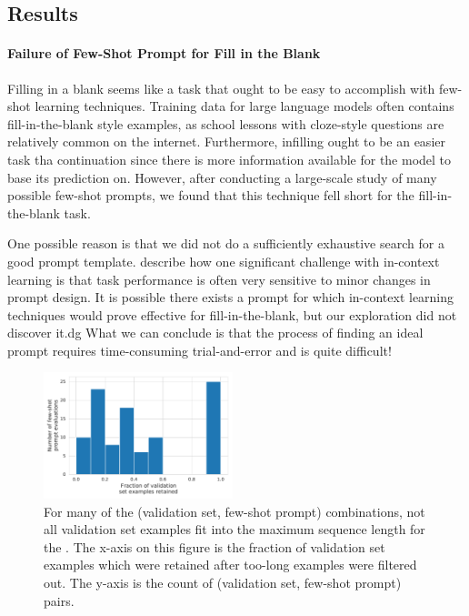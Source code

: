 \subsection{Results}

\paragraph{Failure of Few-Shot Prompt for Fill in the Blank}
Filling in a blank seems like a task that ought to be easy to accomplish with few-shot learning techniques.
Training data for large language models often contains fill-in-the-blank style examples, as school lessons with cloze-style questions are relatively common on the internet.
Furthermore, infilling ought to be an easier task tha continuation since there is more information available for the model to base its prediction on.
However, after conducting a large-scale study of many possible few-shot prompts, we found that this technique fell short for the fill-in-the-blank task.

One possible reason is that we did not do a sufficiently exhaustive search for a good prompt template.
\citet{zhao2021calibrate} describe how one significant challenge with in-context learning is that task performance is often very sensitive to minor changes in prompt design.
It is possible there exists a prompt for which in-context learning techniques would prove effective for fill-in-the-blank, but our exploration did not discover it.dg
What we can conclude is that the process of finding an ideal prompt requires time-consuming trial-and-error and is quite difficult!

\begin{figure}[tbp]
    \centering
    \includegraphics[width=0.49\textwidth]{figures/fs_eval_sets_sizes}
    \caption{For many of the (validation set, few-shot prompt) combinations, not all validation set examples fit into the maximum sequence length for the \LLM.
    The x-axis on this figure is the fraction of validation set examples which were retained after too-long examples were filtered out.
    The y-axis is the count of (validation set, few-shot prompt) pairs.}
    \label{fig:skipped_fs_examples}
\end{figure}


